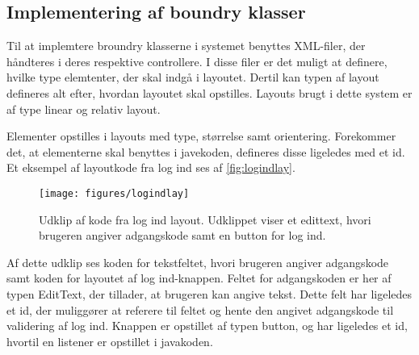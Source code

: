 \subsection{Implementering af boundry klasser}
Til at implemtere broundry klasserne i systemet benyttes XML-filer, der håndteres i deres respektive controllere. I disse filer er det muligt at definere, hvilke type elemtenter, der skal indgå i layoutet. Dertil kan typen af layout defineres alt efter, hvordan layoutet skal opstilles. Layouts brugt i dette system er af type linear og relativ layout.  

Elementer opstilles i layouts med type, størrelse samt orientering. Forekommer det, at elementerne skal benyttes i javekoden, defineres disse ligeledes med et id. Et eksempel af layoutkode fra log ind ses af \autoref{fig:logindlay}.

\begin{figure} [H]
\centering
\texttt{[image: figures/logindlay]}
\caption{Udklip af kode fra log ind layout. Udklippet viser et edittext, hvori brugeren angiver adgangskode samt en button for log ind.}
\label{fig:logindlay}
\end{figure}

Af dette udklip ses koden for tekstfeltet, hvori brugeren angiver adgangskode samt koden for layoutet af log ind-knappen. Feltet for adgangskoden er her af typen EditText, der tillader, at brugeren kan angive tekst. Dette felt har ligeledes et id, der muliggører at referere til feltet og hente den angivet adgangskode til validering af log ind. Knappen er opstillet af typen button, og har ligeledes et id, hvortil en listener er opstillet i javakoden. 
